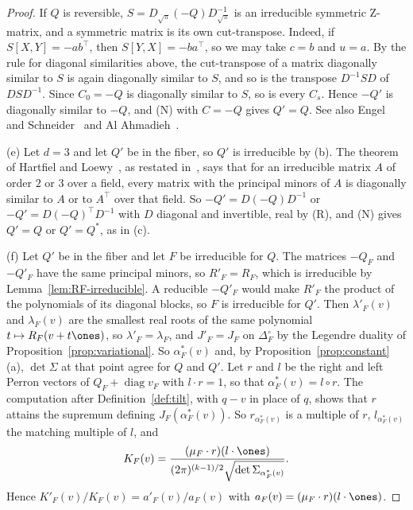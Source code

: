 \begin{proof}
If $Q$ is reversible, $S=D_{\sqrt\pi}(-Q)D_{\sqrt\pi}^{-1}$ is an irreducible
symmetric Z-matrix, and a symmetric matrix is its own cut-transpose. Indeed, if
$S[X,Y]=-ab^\top$, then $S[Y,X]=-ba^\top$, so we may take $c=b$ and $u=a$. By the
rule for diagonal similarities above, the cut-transpose of a matrix diagonally
similar to $S$ is again diagonally similar to $S$, and so is the transpose
$D^{-1}SD$ of $DSD^{-1}$. Since $C_0=-Q$ is diagonally similar to $S$, so is every
$C_s$. Hence $-Q'$ is diagonally similar to $-Q$, and (N) with $C=-Q$ gives
$Q'=Q$. See also Engel and Schneider~\cite[Theorem~3.5]{engelschneider1980} and Al
Ahmadieh~\cite[Lemma~6.1 and Theorem~6.2]{alahmadieh2023}.

(e) Let $d=3$ and let $Q'$ be in the fiber, so $Q'$ is irreducible by (b). The
theorem of Hartfiel and Loewy~\cite[Theorem~3]{hartfielloewy1984}, as restated
in~\cite[Lemma~2.8]{cggr2024}, says that for an irreducible matrix $A$ of order $2$
or $3$ over a field, every matrix with the principal minors of $A$ is diagonally
similar to $A$ or to $A^\top$ over that field. So $-Q'=D(-Q)D^{-1}$ or
$-Q'=D(-Q)^\top D^{-1}$ with $D$ diagonal and invertible, real by (R), and (N) gives
$Q'=Q$ or $Q'=Q^*$, as in (c).

(f) Let $Q'$ be in the fiber and let $F$ be irreducible for $Q$. The matrices $-Q_F$
and $-Q'_F$ have the same principal minors, so $R'_F=R_F$, which is irreducible by
Lemma~\ref{lem:RF-irreducible}. A reducible $-Q'_F$ would make $R'_F$ the product of
the polynomials of its diagonal blocks, so $F$ is irreducible for $Q'$. Then
$\lambda'_F(v)$ and $\lambda_F(v)$ are the smallest real roots of the same
polynomial $t\mapsto R_F(v+t\ones)$, so $\lambda'_F=\lambda_F$, and $J'_F=J_F$ on
$\Delta_F^\circ$ by the Legendre duality of Proposition~\ref{prop:variational}.
So $\alpha^*_F(v)$ and, by Proposition~\ref{prop:constant}(a), $\det\Sigma$ at that
point agree for $Q$ and $Q'$. Let $r$ and $l$ be the right and left Perron vectors
of $Q_F+\operatorname{diag}v_F$ with $l\cdot r=1$, so that $\alpha^*_F(v)=l\circ r$.
The computation after Definition~\ref{def:tilt}, with $q-v$ in place of $q$, shows
that $r$ attains the supremum defining $J_F(\alpha^*_F(v))$. So
$r_{\alpha^*_F(v)}$ is a multiple of $r$, $l_{\alpha^*_F(v)}$ the matching multiple
of $l$, and
\[
 K_F(v)=\frac{(\mu_F\cdot r)(l\cdot\ones)}{(2\pi)^{(k-1)/2}\sqrt{\det\Sigma_{\alpha^*_F(v)}}}.
\]
Hence $K'_F(v)/K_F(v)=a'_F(v)/a_F(v)$ with $a_F(v)=(\mu_F\cdot r)(l\cdot\ones)$.


\end{proof}
